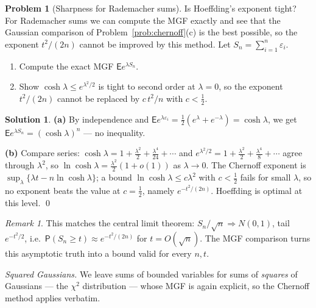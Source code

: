 \documentclass[14pt]{extarticle}
\theoremstyle{definition}
\newtheorem{exercise}{Problem}
\newtheorem*{solution}{Solution}
\theoremstyle{remark}
\newtheorem*{remark}{Remark}
\newcommand\expc{\mathsf{E}}
\newcommand\prb{\mathsf{P}}
\begin{document}
\begin{exercise}[Sharpness for Rademacher sums]\label{prob:sharp}
Is Hoeffding's exponent tight? For Rademacher sums we can compute the MGF exactly and see that the Gaussian comparison of Problem~\ref{prob:chernoff}(c) is the best possible, so the exponent $t^2/(2n)$ cannot be improved by this method. Let $S_n=\sum_{i=1}^n\varepsilon_i$.
\begin{enumerate}[label=(\alph*)]
\item Compute the exact MGF $\expc e^{\lambda S_n}$.
\item Show $\cosh\lambda\le e^{\lambda^2/2}$ is tight to second order at $\lambda=0$, so the exponent $t^2/(2n)$ cannot be replaced by $c\,t^2/n$ with $c<\tfrac12$.
\end{enumerate}
\end{exercise}
\begin{solution}
\textbf{(a)} By independence and $\expc e^{\lambda\varepsilon_i}=\tfrac12(e^\lambda+e^{-\lambda})=\cosh\lambda$, we get $\expc e^{\lambda S_n}=(\cosh\lambda)^n$ --- no inequality.

\textbf{(b)} Compare series: $\cosh\lambda=1+\tfrac{\lambda^2}2+\tfrac{\lambda^4}{24}+\cdots$ and $e^{\lambda^2/2}=1+\tfrac{\lambda^2}2+\tfrac{\lambda^4}8+\cdots$ agree through $\lambda^2$, so $\ln\cosh\lambda=\tfrac{\lambda^2}2(1+o(1))$ as $\lambda\to0$. The Chernoff exponent is $\sup_\lambda\{\lambda t-n\ln\cosh\lambda\}$; a bound $\ln\cosh\lambda\le c\lambda^2$ with $c<\tfrac12$ fails for small $\lambda$, so no exponent beats the value at $c=\tfrac12$, namely $e^{-t^2/(2n)}$. Hoeffding is optimal at this level. \qed
\end{solution}
\begin{remark}
This matches the central limit theorem: $S_n/\sqrt n\Rightarrow N(0,1)$, tail $e^{-t^2/2}$, i.e.\ $\prb(S_n\ge t)\approx e^{-t^2/(2n)}$ for $t=O(\sqrt n)$. The MGF comparison turns this asymptotic truth into a bound valid for every $n,t$.
\end{remark}

\noindent\emph{Squared Gaussians.}\; We leave sums of bounded variables for sums of \emph{squares} of Gaussians --- the $\chi^2$ distribution --- whose MGF is again explicit, so the Chernoff method applies verbatim.
\end{document}
